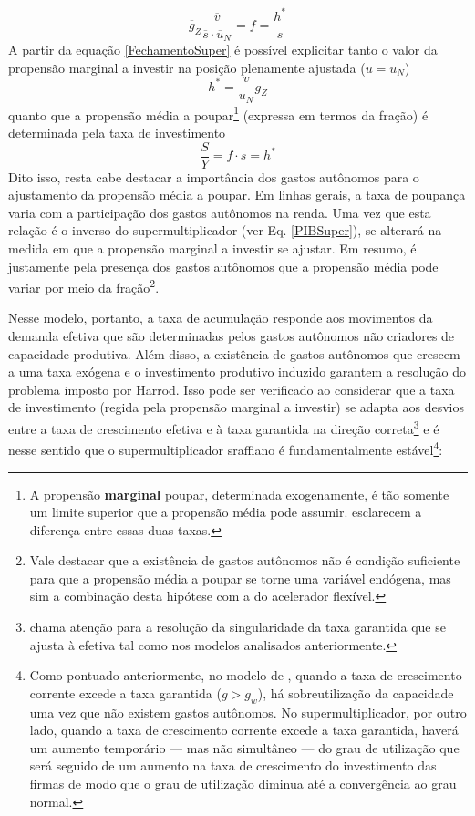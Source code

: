 \begin{equation}
\label{FechamentoSuper}
\overline g_Z\frac{\overline v}{\overline s\cdot \overline u_N} = f = \frac{h^*}{s}
\end{equation}
A partir da equação \ref{FechamentoSuper} é possível explicitar tanto o valor da propensão marginal a investir na posição plenamente ajustada ($u = u_N$)
$$
h^* = \frac{v}{u_N}g_Z
$$
quanto que a propensão média a poupar\footnote{A propensão \textbf{marginal} poupar, determinada exogenamente, é tão somente um limite superior que a propensão média pode assumir. \textcite[p.~51--52]{serrano_o_2000} esclarecem a diferença entre essas duas taxas.} (expressa em termos da fração) é determinada pela taxa de investimento 
$$
\frac{S}{Y} = f\cdot s = h^*
$$
Dito isso, resta cabe destacar a importância dos gastos autônomos para o ajustamento da propensão média a poupar.
Em linhas gerais, a taxa de poupança varia com a participação dos gastos autônomos na renda.
Uma vez que esta relação é o inverso do supermultiplicador (ver Eq. \ref{PIBSuper}), se alterará na medida em que a propensão marginal a investir se ajustar.
Em resumo, é justamente pela presença dos gastos autônomos que a propensão média pode variar por meio da fração\footnote{
	Vale destacar que a existência de gastos autônomos não é condição suficiente para que a propensão média a poupar se torne uma variável endógena, mas sim a combinação desta hipótese com a do acelerador flexível.
}.

Nesse modelo, portanto, a taxa de acumulação responde aos movimentos da demanda efetiva que são determinadas pelos gastos autônomos não criadores de capacidade produtiva. Além disso, a existência de gastos autônomos que crescem a uma taxa exógena e o investimento produtivo induzido garantem a resolução do problema imposto por Harrod. Isso pode ser verificado ao considerar que a taxa de investimento (regida pela propensão marginal a investir) se adapta aos desvios entre a taxa de crescimento efetiva e à taxa garantida na direção correta\footnote{\textcite{cesaratto_neo-kaleckian_2015} chama atenção para a resolução da singularidade da taxa garantida que se ajusta à efetiva tal como nos modelos analisados anteriormente.} e é nesse sentido que o supermultiplicador sraffiano é fundamentalmente estável\footnote{
	Como pontuado anteriormente, no modelo de \textcite{harrod_essay_1939}, quando a taxa de crescimento corrente excede a taxa garantida ($g > g_w$), há sobreutilização da capacidade uma vez que não existem gastos autônomos. 
	No supermultiplicador, por outro lado, quando a taxa de crescimento corrente excede a taxa garantida, haverá 
	um aumento temporário --- mas não simultâneo --- do grau de utilização que será seguido de um aumento na taxa de crescimento do investimento das firmas de modo que o grau de utilização diminua até a convergência ao grau normal.}:

